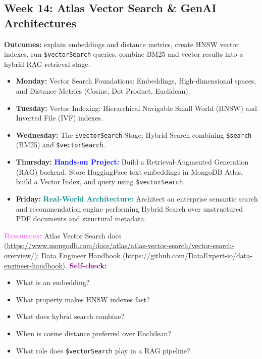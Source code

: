 \documentclass[11pt, a4paper]{article}
\newcommand{\project}[1]{\textbf{\textcolor{blue}{Hands-on Project:}} #1}
\newcommand{\usecase}[1]{\textbf{\textcolor{teal}{Real-World Architecture:}} #1}
\newcommand{\dayitem}[2]{\item \textbf{#1:} #2}
\newcommand{\selfcheck}[1]{\vspace{1mm}\noindent\textbf{\textcolor{purple}{Self-check:}} #1}
\newcommand{\resources}[1]{\vspace{1mm}\noindent\textbf{\textcolor{violet}{Resources:}} #1}
\begin{document}
\subsection*{Week 14: Atlas Vector Search \& GenAI Architectures}
\par\noindent\textbf{Outcomes:} explain embeddings and distance metrics, create HNSW vector indexes, run \texttt{\$vectorSearch} queries, combine BM25 and vector results into a hybrid RAG retrieval stage.
\begin{itemize}[label=-]
    \dayitem{Monday}{Vector Search Foundations: Embeddings, High-dimensional spaces, and Distance Metrics (Cosine, Dot Product, Euclidean).}
    \dayitem{Tuesday}{Vector Indexing: Hierarchical Navigable Small World (HNSW) and Inverted File (IVF) indexes.}
    \dayitem{Wednesday}{The \texttt{\$vectorSearch} Stage: Hybrid Search combining \texttt{\$search} (BM25) and \texttt{\$vectorSearch}.}
    \dayitem{Thursday}{\project{Build a Retrieval-Augmented Generation (RAG) backend. Store HuggingFace text embeddings in MongoDB Atlas, build a Vector Index, and query using \texttt{\$vectorSearch}.}}
    \dayitem{Friday}{\usecase{Architect an enterprise semantic search and recommendation engine performing Hybrid Search over unstructured PDF documents and structural metadata.}}
\end{itemize}
\resources{Atlas Vector Search docs (\url{https://www.mongodb.com/docs/atlas/atlas-vector-search/vector-search-overview/}); Data Engineer Handbook (\url{https://github.com/DataExpert-io/data-engineer-handbook}).}
\selfcheck{\begin{itemize}[label=-, itemsep=0pt, leftmargin=1.5em]
    \item What is an embedding?
    \item What property makes HNSW indexes fast?
    \item What does hybrid search combine?
    \item When is cosine distance preferred over Euclidean?
    \item What role does \texttt{\$vectorSearch} play in a RAG pipeline?
\end{itemize}}
\end{document}

